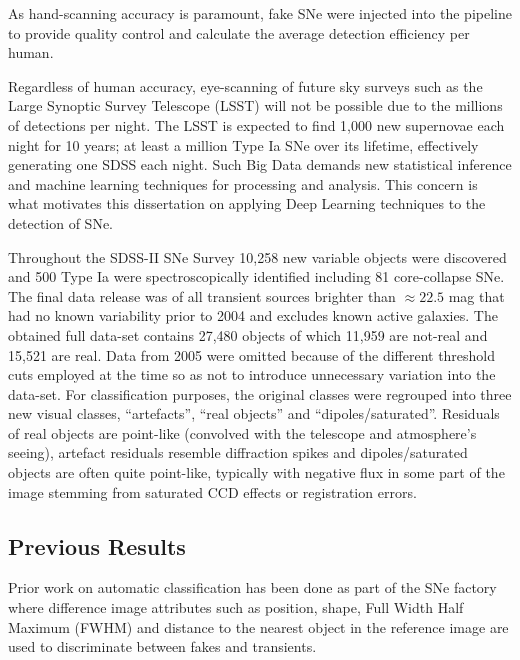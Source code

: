 As hand-scanning accuracy is paramount, fake SNe were injected into the pipeline to provide quality control and calculate the average detection efficiency per human\citep{kessler2015difference}\citep{dilday2008measurement}.

Regardless of human accuracy, eye-scanning of future sky surveys such as the Large Synoptic Survey Telescope (LSST) will not be possible due to the millions of detections per night.
The LSST is expected to find 1,000 new supernovae each night for 10 years; at least a million Type Ia SNe over its lifetime, effectively generating one SDSS each night\citep{abell2009lsst}\citep{mickaelian2015astronomical}.
Such Big Data demands new statistical inference and machine learning techniques for processing and analysis.
This concern is what motivates this dissertation on applying Deep Learning techniques to the detection of SNe.

Throughout the SDSS-II SNe Survey 10,258 new variable objects were discovered and 500 Type Ia were spectroscopically identified including 81 core-collapse SNe.
The final data release was of all transient sources brighter than $\approx 22.5$ mag that had no known variability prior to 2004 and excludes known active galaxies.
The obtained full data-set contains 27,480 objects of which 11,959 are not-real and 15,521 are real.
Data from 2005 were omitted because of the different threshold cuts employed at the time so as not to introduce unnecessary variation into the data-set.
For classification purposes, the original classes were regrouped into three new visual classes, ``artefacts'', ``real objects'' and ``dipoles/saturated''.
Residuals of real objects are point-like (convolved with the telescope and atmosphere’s seeing), artefact residuals resemble diffraction spikes and dipoles/saturated objects are often quite point-like, typically with negative flux in some part of the image stemming from saturated CCD effects or registration errors.

\subsection{Previous Results}
Prior work on automatic classification has been done as part of the SNe factory where difference image attributes such as position, shape, Full Width Half Maximum (FWHM) and distance to the nearest object in the reference image are used to discriminate between fakes and transients\citep{bailey2007find}\citep{romano2006supernova}.

